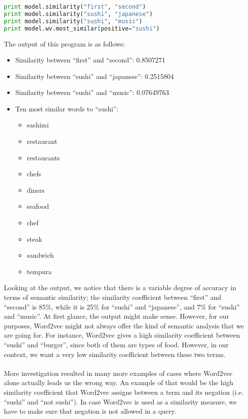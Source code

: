 \begin{itemize}
\begin{lstlisting}[language=Python]
print model.similarity("first", "second")
print model.similarity("sushi", "japanese")
print model.similarity("sushi", "music")
print model.wv.most_similar(positive="sushi")
\end{lstlisting}
The output of this program is as follows:
\begin{itemize}
\item Similarity between ``first'' and ``second'': 0.8507271
\item Similarity between ``sushi'' and ``japanese'': 0.2515804
\item Similarity between ``sushi'' and ``music'': 0.07649763
\newpage
\item Ten most similar words to ``sushi'':
\begin{itemize}
\item sashimi
\item restaurant
\item restaurants
\item chefs
\item diners
\item seafood
\item chef
\item steak
\item sandwich
\item tempura
\end{itemize}
\end{itemize}
Looking at the output, we notice that there is a variable degree of accuracy in terms of semantic similarity; the similarity coefficient between ``first'' and ``second'' is 85\%, while it is 25\% for ``sushi'' and ``japanese'', and 7\% for ``sushi'' and ``music''. At first glance, the output might make sense. However, for our purposes, Word2vec might not always offer the kind of semantic analysis that we are going for. For instance, Word2vec gives a high similarity coefficient between ``sushi'' and ``burger'', since both of them are types of food. However, in our context, we want a very low similarity coefficient between these two terms.\\\\
More investigation resulted in many more examples of cases where Word2vec alone actually leads us the wrong way. An example of that would be the high similarity coefficient that Word2vec assigns between a term and its negation (i.e. ``sushi'' and ``not sushi''). In case Word2vec is used as a similarity measure, we have to make sure that negation is not allowed in a query.\\\\

\end{itemize}
